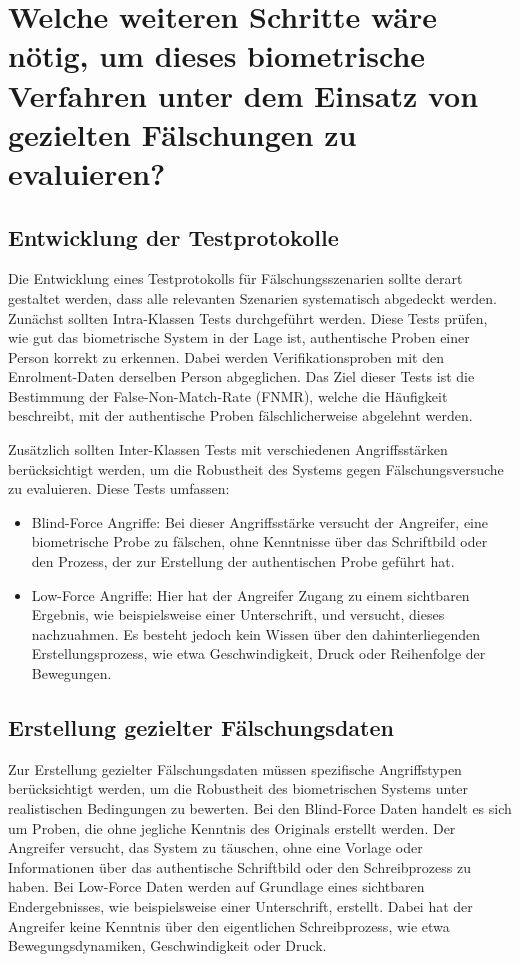 \documentclass{article}
\begin{document}
\section{Welche weiteren Schritte wäre nötig, um dieses biometrische Verfahren unter dem Einsatz von gezielten Fälschungen zu evaluieren?}

\subsection{Entwicklung der Testprotokolle}

Die Entwicklung eines Testprotokolls für Fälschungsszenarien sollte derart gestaltet werden, dass alle 
relevanten Szenarien systematisch abgedeckt werden. Zunächst sollten Intra-Klassen Tests durchgeführt 
werden. Diese Tests prüfen, wie gut das biometrische System in der Lage ist, authentische Proben einer 
Person korrekt zu erkennen. Dabei werden Verifikationsproben mit den Enrolment-Daten derselben Person 
abgeglichen. Das Ziel dieser Tests ist die Bestimmung der False-Non-Match-Rate (FNMR), welche die 
Häufigkeit beschreibt, mit der authentische Proben fälschlicherweise abgelehnt werden.

Zusätzlich sollten Inter-Klassen Tests mit verschiedenen Angriffsstärken berücksichtigt werden, um die 
Robustheit des Systems gegen Fälschungsversuche zu evaluieren. Diese Tests umfassen:

\begin{itemize}
	\item Blind-Force Angriffe: Bei dieser Angriffsstärke versucht der Angreifer, eine biometrische Probe zu fälschen, ohne Kenntnisse über das Schriftbild oder den Prozess, der zur Erstellung der authentischen Probe geführt hat.
	\item Low-Force Angriffe: Hier hat der Angreifer Zugang zu einem sichtbaren Ergebnis, wie beispielsweise einer Unterschrift, und versucht, dieses nachzuahmen. Es besteht jedoch kein Wissen über den dahinterliegenden Erstellungsprozess, wie etwa Geschwindigkeit, Druck oder Reihenfolge der Bewegungen.
\end{itemize}

\subsection{Erstellung gezielter Fälschungsdaten}

Zur Erstellung gezielter Fälschungsdaten müssen spezifische Angriffstypen berücksichtigt werden, um die Robustheit des biometrischen Systems unter realistischen Bedingungen zu bewerten.
Bei den Blind-Force Daten handelt es sich um Proben, die ohne jegliche Kenntnis des Originals erstellt werden. Der Angreifer versucht, das System zu täuschen, ohne eine Vorlage oder Informationen über das authentische Schriftbild oder den Schreibprozess zu haben.
Bei Low-Force Daten werden auf Grundlage eines sichtbaren Endergebnisses, wie beispielsweise einer Unterschrift, erstellt. Dabei hat der Angreifer keine Kenntnis über den eigentlichen Schreibprozess, wie etwa Bewegungsdynamiken, Geschwindigkeit oder Druck.
\end{document}
